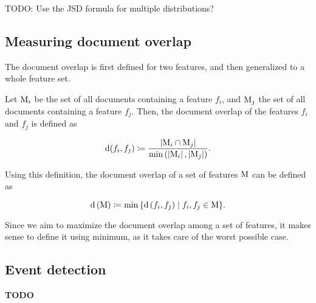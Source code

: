 {\color{red}TODO: Use the JSD formula for multiple distributions?}


\subsection{Measuring document overlap}

The document overlap is first defined for two features, and then generalized to a whole feature set.

Let $\text{M}_{i}$ be the set of all documents containing a feature $f_{i}$, and $\text{M}_{j}$ the set of all documents containing a feature $f_{j}$. Then, the document overlap of the features $f_{i}$ and $f_{j}$ is defined as

\begin{equation}
	\text{d}(f_{i}, f_{j}) \coloneqq \frac{\left\vert{\text{M}_{i} \cap \text{M}_{j}}\right\vert}{\min \left( {\left\vert{\text{M}_{i}}\right\vert, \left\vert{\text{M}_{j}}\right\vert} \right)}.
\end{equation}

Using this definition, the document overlap of a set of features $\text{M}$ can be defined as

\begin{equation}
	\text{d} \left( \text{M} \right) \coloneqq \min{\{ \text{d}\left( f_{i}, f_{j} \right) \mid f_{i}, f_{j} \in \text{M}\}}.
\end{equation}

Since we aim to maximize the document overlap among a set of features, it makes sense to define it using minimum, as it takes care of the worst possible case.


\subsection{Event detection}

\textbf{TODO}